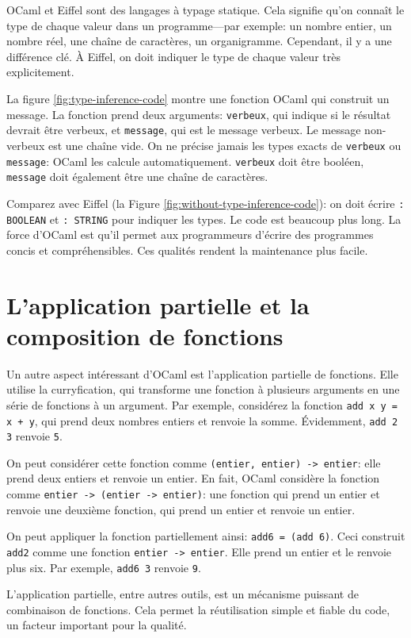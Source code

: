 \documentclass[french]{report}
\begin{document}
OCaml et Eiffel sont des langages à typage statique. Cela signifie qu'on connaît le type de chaque valeur dans un programme---par exemple: un nombre entier, un nombre réel, une chaîne de caractères, un organigramme. Cependant, il y a une différence clé. À Eiffel, on doit indiquer le type de chaque valeur très explicitement.

La figure \ref{fig:type-inference-code} montre une fonction OCaml qui construit un message. La fonction prend deux arguments: \texttt{verbeux}, qui indique si le résultat devrait être verbeux, et \texttt{message}, qui est le message verbeux. Le message non-verbeux est une chaîne vide. On ne précise jamais les types exacts de \texttt{verbeux} ou \texttt{message}: OCaml les calcule automatiquement. \texttt{verbeux} doit être booléen, \texttt{message} doit également être une chaîne de caractères.

Comparez avec Eiffel (la Figure \ref{fig:without-type-inference-code}): on doit écrire \texttt{: BOOLEAN} et \texttt{: STRING} pour indiquer les types. Le code est beaucoup plus long. La force d'OCaml est qu'il permet aux programmeurs d'écrire des programmes concis et compréhensibles. Ces qualités rendent la maintenance plus facile.

\section{L'application partielle et la composition de fonctions}

Un autre aspect intéressant d'OCaml est l'application partielle de fonctions. Elle utilise la curryfication, qui transforme une fonction à plusieurs arguments en une série de fonctions à un argument. Par exemple, considérez la fonction \texttt{add x y = x + y}, qui prend deux nombres entiers et renvoie la somme. Évidemment, \texttt{add 2 3} renvoie \texttt{5}.

On peut considérer cette fonction comme \texttt{(entier, entier) -> entier}: elle prend deux entiers et renvoie un entier. En fait, OCaml considère la fonction comme \texttt{entier -> (entier -> entier)}: une fonction qui prend un entier et renvoie une deuxième fonction, qui prend un entier et renvoie un entier. 

On peut appliquer la fonction partiellement ainsi: \texttt{add6 = (add 6)}. Ceci construit \texttt{add2} comme une fonction \texttt{entier -> entier}. Elle prend un entier et le renvoie plus six. Par exemple, \texttt{add6 3} renvoie \texttt{9}.

L'application partielle, entre autres outils, est un mécanisme puissant de combinaison de fonctions. Cela permet la réutilisation simple et fiable du code, un facteur important pour la qualité.
\end{document}
